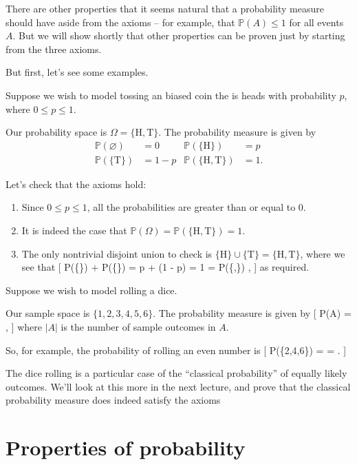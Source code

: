 \documentclass[
  letterpaper,
  DIV=11,
  numbers=noendperiod]{scrreprt}
\providecommand{\tightlist}{%
  \setlength{\itemsep}{0pt}\setlength{\parskip}{0pt}}\usepackage{longtable,booktabs,array}
\theoremstyle{remark}
\begin{document}
There are other properties that it seems natural that a probability
measure should have aside from the axioms -- for example, that
\(\mathbb P(A) \leq 1\) for all events \(A\). But we will show shortly
that other properties can be proven just by starting from the three
axioms.

But first, let's see some examples.

Suppose we wish to model tossing an biased coin the is heads with
probability \(p\), where \(0 \leq p \leq 1\).

Our probability space is \(\Omega = \{\text{H}, \text{T}\}\). The
probability measure is given by \begin{align*}
   \mathbb P(\varnothing) &= 0  &  \mathbb P(\{\text{H}\}) &= p \\
   \mathbb P(\{\text{T}\}) &= 1 - p  &  \mathbb P(\{\text{H},\text{T}\})  &= 1 .
\end{align*}

Let's check that the axioms hold:

\begin{enumerate}
\def\labelenumi{\arabic{enumi}.}
\tightlist
\item
  Since \(0 \leq p \leq 1\), all the probabilities are greater than or
  equal to 0.
\item
  It is indeed the case that
  \(\mathbb P(\Omega) = \mathbb P(\{\text{H},\text{T}\}) = 1\).
\item
  The only nontrivial disjoint union to check is
  \(\{\text{H}\} \cup \{\text{T}\} = \{\text{H},\text{T}\}\), where we
  see that {[} \mathbb P(\{\}) + \mathbb P(\{\}) = p +
  (1 - p) = 1 = \mathbb P(\{,\}) , {]} as required.
\end{enumerate}

Suppose we wish to model rolling a dice.

Our sample space is \(\{1,2,3,4,5,6\}\). The probability measure is
given by {[} \mathbb P(A) =  , {]} where \(|A|\) is the
number of sample outcomes in \(A\).

So, for example, the probability of rolling an even number is {[}
\mathbb P(\{2,4,6\}) =  =  . {]}

The dice rolling is a particular case of the ``classical probability''
of equally likely outcomes. We'll look at this more in the next lecture,
and prove that the classical probability measure does indeed satisfy the
axioms

\hypertarget{prob-properties}{%
\section{Properties of probability}\label{prob-properties}}
\end{document}
